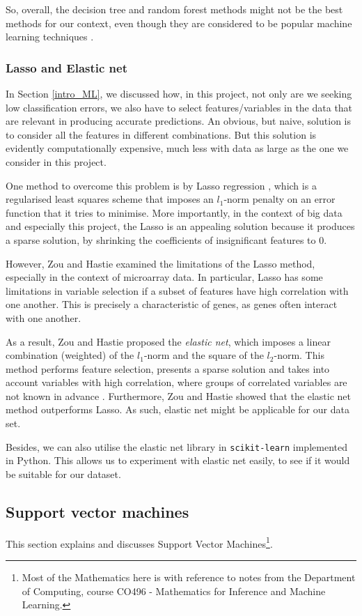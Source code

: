\documentclass[12pt, twoside, a4paper]{article}
\begin{document}
So, overall, the decision tree and random forest methods might not be the best methods for our context, even though they are considered to be popular machine learning techniques \cite{RefWorks:103}.

\subsubsection{Lasso and Elastic net}
In Section \ref{intro_ML}, we discussed how, in this project, not only are we seeking low classification errors, we also have to select features/variables in the data that are relevant in producing accurate predictions. An obvious, but naive, solution is to consider all the features in different combinations. But this solution is evidently computationally expensive, much less with data as large as the one we consider in this project.

One method to overcome this problem is by Lasso regression \cite{RefWorks:94}, which is a regularised least squares scheme that imposes an $l_1$-norm penalty on an error function that it tries to minimise. More importantly, in the context of big data and especially this project, the Lasso is an appealing solution because it produces a sparse solution, by shrinking the coefficients of insignificant features to 0.

However, Zou and Hastie \cite{RefWorks:96} examined the limitations of the Lasso method, especially in the context of microarray data. In particular, Lasso has some limitations in variable selection if a subset of features have high correlation with one another. This is precisely a characteristic of genes, as genes often interact with one another.

As a result, Zou and Hastie proposed the \textit{elastic net}, which imposes a linear combination (weighted) of the $l_1$-norm and the square of the $l_2$-norm. This method performs feature selection, presents a sparse solution and takes into account variables with high correlation, where groups of correlated variables are not known in advance \cite{RefWorks:93}. Furthermore, Zou and Hastie showed that the elastic net method outperforms Lasso. As such, elastic net might be applicable for our data set.

Besides, we can also utilise the elastic net library in \texttt{scikit-learn} implemented in Python. This allows us to experiment with elastic net easily, to see if it would be suitable for our dataset.


\subsection{Support vector machines}
This section explains and discusses Support Vector Machines\footnote{Most of the Mathematics here is with reference to notes from the Department of Computing, course CO496 - Mathematics for Inference and Machine Learning.}.
\end{document}
